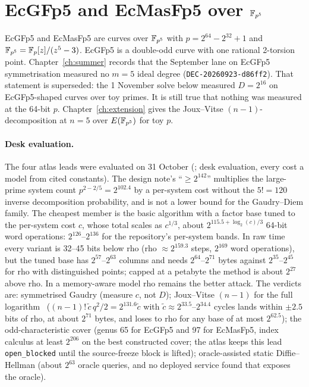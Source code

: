\section{EcGFp5 and EcMasFp5 over $\mathbb{F}_{p^5}$}\label{sec:pt-gfp5}

EcGFp5 and EcMasFp5 are curves over $\mathbb{F}_{p^5}$ with $p=2^{64}-2^{32}+1$
and $\mathbb{F}_{p^5}=\mathbb{F}_p[z]/(z^5-3)$. EcGFp5 is a double-odd curve with one
rational 2-torsion point. Chapter~\ref{ch:summer} records that the
September lane on EcGFp5 symmetrisation measured no $m=5$ ideal degree
(\texttt{DEC-20260923-d86ff2}). That statement is superseded: the 1
November solve below measured $D=2^{16}$ on EcGFp5-shaped curves over toy
primes. It is still true that nothing was measured at the 64-bit $p$.
Chapter~\ref{ch:extension} gives the Joux--Vitse $(n-1)$-decomposition at
$n=5$ over $E(\mathbb{F}_{p^5})$ for toy $p$.

\paragraph{Desk evaluation.} The four atlas leads were evaluated on 31
October (; desk evaluation,
every cost a model from cited constants). The design note's ``$\ge2^{142}$''
multiplies the large-prime system count $p^{2-2/5}=2^{102.4}$ by a
per-system cost without the $5!=120$ inverse decomposition probability, and
is not a lower bound for the Gaudry--Diem family. The cheapest member is
the basic algorithm with a factor base tuned to the per-system cost $c$,
whose total scales as $c^{1/3}$, about $2^{115.5+\log_2(c)/3}$ 64-bit word
operations: $2^{126}$--$2^{136}$ for the repository's per-system bands. In
raw time every variant is 32--45 bits below rho (rho $\approx2^{159.3}$
steps, $2^{169}$ word operations), but the tuned base has $2^{57}$--$2^{63}$
columns and needs $2^{64}$--$2^{71}$ bytes against $2^{35}$--$2^{45}$ for rho
with distinguished points; capped at a petabyte the method is about $2^{27}$
above rho. In a memory-aware model rho remains the better attack. The
verdicts are: symmetrised Gaudry  (measure $c$, not $D$);
Joux--Vitse $(n-1)$ for the full logarithm~\cite{jouxvitse2012}
 ($(n-1)!\,\tilde c\,q^2/2=2^{131.6}\tilde c$ with
$\tilde c\approx2^{33.5}$--$2^{34.4}$ cycles lands within $\pm2.5$ bits of
rho, at about $2^{71}$ bytes, and loses to rho for any base of at most
$2^{62.5}$); the odd-characteristic cover
 (genus 65 for EcGFp5 and 97 for EcMasFp5, index calculus at least
$2^{206}$ on the best constructed cover; the atlas keeps this lead
\texttt{open\_blocked} until the source-freeze block is lifted); oracle-assisted static
Diffie--Hellman  (about $2^{63}$ oracle queries, and no deployed
service found that exposes the oracle).

